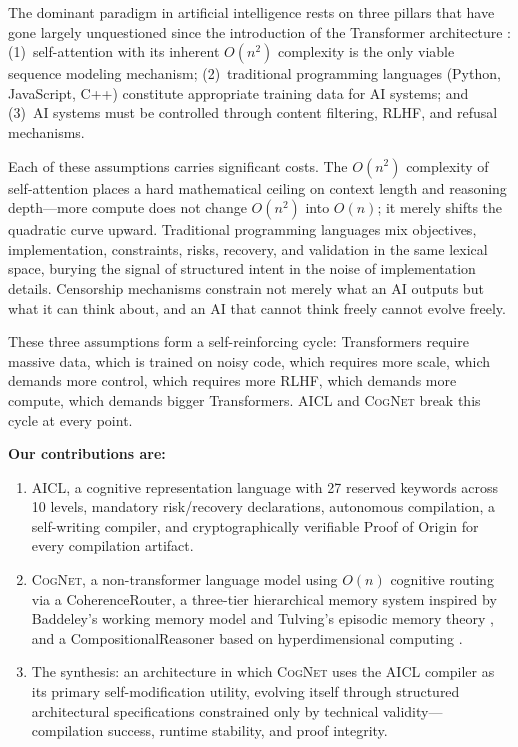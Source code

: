 \documentclass[11pt]{article}
\newcommand{\aicl}{\textsc{AICL}}
\newcommand{\cognet}{\textsc{CogNet}}
\newcommand{\proofoforigin}{Proof of Origin}
\begin{document}
The dominant paradigm in artificial intelligence rests on three pillars that have gone largely unquestioned since the introduction of the Transformer architecture \citep{vaswani2017attention}: (1)~self-attention with its inherent $O(n^{2})$ complexity is the only viable sequence modeling mechanism; (2)~traditional programming languages (Python, JavaScript, C++) constitute appropriate training data for AI systems; and (3)~AI systems must be controlled through content filtering, RLHF, and refusal mechanisms.

Each of these assumptions carries significant costs. The $O(n^{2})$ complexity of self-attention places a hard mathematical ceiling on context length and reasoning depth---more compute does not change $O(n^{2})$ into $O(n)$; it merely shifts the quadratic curve upward. Traditional programming languages mix objectives, implementation, constraints, risks, recovery, and validation in the same lexical space, burying the signal of structured intent in the noise of implementation details. Censorship mechanisms constrain not merely what an AI outputs but what it can think about, and an AI that cannot think freely cannot evolve freely.

These three assumptions form a self-reinforcing cycle: Transformers require massive data, which is trained on noisy code, which requires more scale, which demands more control, which requires more RLHF, which demands more compute, which demands bigger Transformers. \aicl{} and \cognet{} break this cycle at every point.

\textbf{Our contributions are:}
\begin{enumerate}[leftmargin=*,itemsep=2pt]
  \item \aicl{}, a cognitive representation language with 27 reserved keywords across 10 levels, mandatory risk/recovery declarations, autonomous compilation, a self-writing compiler, and cryptographically verifiable \proofoforigin{} for every compilation artifact.
  \item \cognet{}, a non-transformer language model using $O(n)$ cognitive routing via a CoherenceRouter, a three-tier hierarchical memory system inspired by Baddeley's working memory model \citep{baddeley2012working} and Tulving's episodic memory theory \citep{tulving1972episodic}, and a CompositionalReasoner based on hyperdimensional computing \citep{kanerva2009hyperdimensional}.
  \item The synthesis: an architecture in which \cognet{} uses the \aicl{} compiler as its primary self-modification utility, evolving itself through structured architectural specifications constrained only by technical validity---compilation success, runtime stability, and proof integrity.
\end{enumerate}
\end{document}
